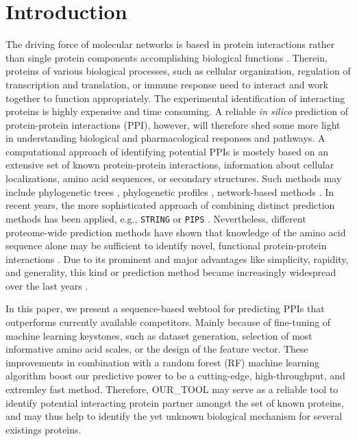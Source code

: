 \documentclass[preprint,3p,times,twocolumn]{elsarticle}
\newcommand{\TODO}[1] {\begingroup\color{red}#1\endgroup}
\begin{document}
\section{Introduction}
The driving force of molecular networks is based in protein
interactions rather than single protein components accomplishing
biological functions \cite{Pawson:2004}. Therein, proteins of various
biological processes, such as cellular organization, regulation of
transcription and translation, or immune response need to interact and
work together to function appropriately. The experimental
identification of interacting proteins is highly expensive and time
consuming. A reliable \textit{in silico} prediction of protein-protein
interactions (PPI), however, will therefore shed some more
light in understanding biological and pharmacological responses and pathways. A
computational approach of identifying potential PPIs is mostely based
on an extensive set of known protein-protein interactions, information
about cellular localizations, amino acid sequences, or secondary
structures. Such methods may include phylogenetic trees
\cite{Pazos:2001}, phylogenetic profiles \cite{Barker:2005},
network-based methods \cite{Yook:2004, Clauset:2008}. In recent years,
the more sophisticated approach of combining distinct prediction
methods has been applied, e.g., \texttt{STRING} \cite{Szklarczyk:2011}
or \texttt{PIPS} \cite{McDowall:2009}. Nevertheless, different proteome-wide prediction methods have shown
that knowledge of the amino acid sequence alone may be sufficient to identify novel,
functional protein-protein interactions \cite{Martin:2005,
  Shen:2007}. Due to its prominent and major advantages like simplicity, rapidity,
and generality, this kind or prediction method became increasingly
widespread over the last years \cite{Ofran:2003, Betel:2007, Liu:2012,
  Perovic:2017, Pan:2010}.

In this paper, we present a sequence-based webtool for predicting PPIs
that outperforms currently available competitors. Mainly because of
fine-tuning of machine learning keystones, such as dataset generation,
selection of most informative amino acid scales, or the design of the
feature vector. These improvements in combination with a random forest
(RF) machine learning algorithm boost our predictive power to be a
cutting-edge, high-throughput, and extremley fast method. Therefore,
\TODO{OUR\_TOOL} may serve as a reliable tool to identify potential
interacting protein partner amongst the set of known proteins, and may
thus help to identify the yet unknown biological mechanism for several
existings proteins.
\end{document}
